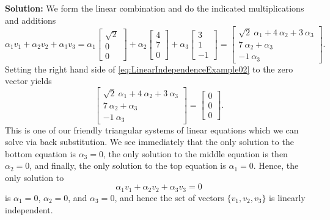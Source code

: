 \textbf{Solution:} We form the linear combination and do the indicated multiplications and additions
\begin{equation}
\label{eq:LinearIndependenceExample02}
    \alpha_1 v_1 + \alpha_2 v_2 + \alpha_3 v_3 = 
    \alpha_1 \left[ \begin{array}{r} \sqrt{2} \\0\\ 0  \end{array} \right] 
+ \alpha_2 \left[ \begin{array}{r}  4 \\ 7 \\ 0  \end{array} \right] 
+ \alpha_3 \left[ \begin{array}{r} 3 \\ 1 \\ -1   \end{array} \right]  = \left[ \begin{array}{r}  \sqrt{2}\  \alpha_1  + 4\ \alpha_2 + 3\ \alpha_3\\7 \ \alpha_2 + \alpha_3\\  -1\ \alpha_3 \end{array} \right].
\end{equation}
Setting the right hand side of \eqref{eq:LinearIndependenceExample02} to the zero vector yields
\begin{equation}
\label{eq:LinearIndependenceExample02b}
   \left[ \begin{array}{r}  \sqrt{2}\  \alpha_1  + 4\ \alpha_2 + 3\ \alpha_3\\7 \ \alpha_2 + \alpha_3\\  -1\ \alpha_3 \end{array} \right] = \left[ \begin{array}{r} 0 \\ 0 \\ 0   \end{array} \right].
\end{equation}
This is one of our friendly triangular systems of linear equations which we can solve via back substitution. We see immediately that the only solution to the bottom equation is $\alpha_3=0$, the only solution to the middle equation is then $\alpha_2 = 0$, and finally, the only solution to the top equation is $\alpha_1=0$. Hence, the only solution to 
$$ \alpha_1 v_1 + \alpha_2 v_2 + \alpha_3 v_3 =0 $$
is $\alpha_1=0$, $\alpha_2 = 0$, and $\alpha_3=0$, and hence the set of vectors  $ \{v_1, v_2, v_3 \} $ is linearly independent.\\

